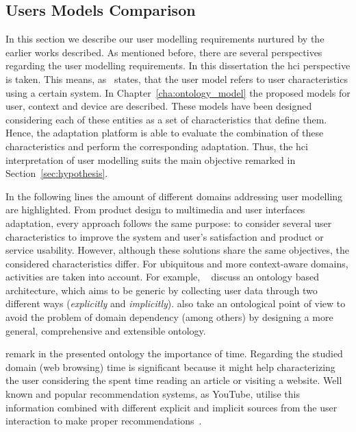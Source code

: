 
\subsection{Users Models Comparison}
\label{sec:user_model_comparison}

In this section we describe our user modelling requirements nurtured by the 
earlier works described. As mentioned before, there are several perspectives 
regarding the user modelling requirements. In this dissertation the \ac{hci} 
perspective is taken. This means, as~\citet{pohl_logic_based_1999} states, 
that the user model refers to user characteristics using a certain system. 
In Chapter~\ref{cha:ontology_model} the proposed models for user, context and device are described. These models
have been designed considering each of these entities as a set of characteristics
that define them. Hence, the adaptation platform is able to evaluate the
combination of these characteristics and perform the corresponding adaptation.
Thus, the \ac{hci} interpretation of user modelling suits the main objective 
remarked in Section~\ref{sec:hypothesis}.


In the following lines the amount of different domains addressing user modelling 
are highlighted. From product design to multimedia and user interfaces adaptation, 
every approach follows the same purpose: to consider several user characteristics 
to improve the system and user's satisfaction and product or service usability. 
However, although these solutions share the same objectives, the considered 
characteristics differ. For ubiquitous and more context-aware domains, activities 
are taken into account. For example, ~\citet{razmerita_ontology_based_2003} 
discuss an ontology based architecture, which aims to be generic by collecting 
user data through two different ways (\textit{explicitly} and \textit{implicitly}).
\citet{golemati_creating_2007} also take an ontological point of view to avoid 
the problem of domain dependency (among others) by designing a more general, 
comprehensive and extensible ontology. 

\citet{gauch_ontology_based_2003} remark in the presented ontology the 
importance of time. Regarding the studied domain (web browsing) time is 
significant because it might help characterizing the user considering the spent 
time reading an article or visiting a website. Well known and popular 
recommendation systems, as YouTube, utilise this information combined with 
different explicit and implicit sources from the user interaction to make proper
recommendations~\citep{davidson_youtube_2010}.

